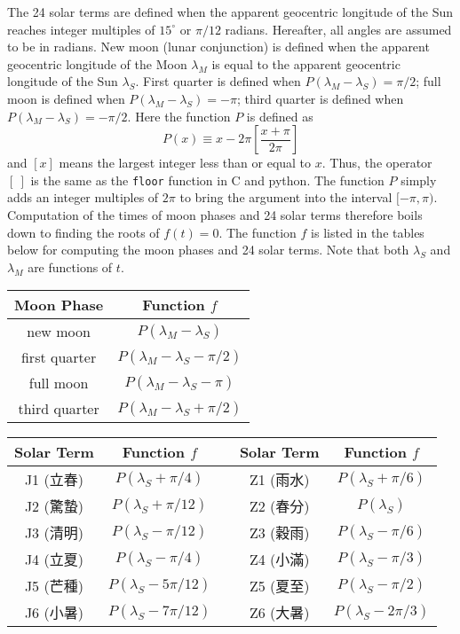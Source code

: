 \documentclass[12pt]{article}
\newcommand \beq {\begin{equation}}
\newcommand \eeq {\end{equation}}
\begin{document}
\begin{CJK}{UTF8}{bkai}
The 24 solar terms are defined when the apparent geocentric longitude of the 
Sun reaches integer multiples of $15^\circ$ or $\pi/12$ radians. Hereafter, 
all angles are assumed to be in radians. New moon (lunar conjunction) 
is defined when the apparent geocentric longitude of the Moon $\lambda_M$ is 
equal to the apparent geocentric longitude of the Sun $\lambda_S$. First 
quarter is defined when $P(\lambda_M-\lambda_S) = \pi/2$; 
full moon is defined when $P(\lambda_M-\lambda_S) = -\pi$; 
third quarter is defined when $P(\lambda_M-\lambda_S) = -\pi/2$. 
Here the function $P$ is defined as 
\beq
  P(x) \equiv x - 2\pi \left[ \frac{x+\pi}{2\pi}\right] 
\eeq
and $[x]$ means the largest integer less than or equal to $x$. Thus, the 
operator $[\ ]$ is the same as the {\tt floor} function in C and python. 
The function $P$ simply adds an integer multiples of $2\pi$ to bring the 
argument into the interval $[-\pi,\pi)$.
Computation of the times of moon phases and 24 solar terms therefore boils 
down to finding the roots of $f(t)=0$. The function $f$ is listed in the tables 
below for computing the moon phases and 24 solar terms. Note that both $\lambda_S$ 
and $\lambda_M$ are functions of $t$.
\vskip 5mm
\begin{tabular}{cc}
\hline
 Moon Phase & Function $f$ \\
\hline 
 new moon & $P(\lambda_M - \lambda_S)$ \\ 
 first quarter & $P(\lambda_M - \lambda_S - \pi/2)$ \\ 
 full moon & $P(\lambda_M - \lambda_S - \pi)$ \\
 third quarter & $P(\lambda_M - \lambda_S + \pi/2)$ \\
\hline
\end{tabular}
\begin{tabular}{cc|c|cc}
\hline
 Solar Term & Function $f$ & & Solar Term & Function $f$ \\
\hline
  J1 (立春) & $P(\lambda_S + \pi/4)$ & & Z1 (雨水) & $P(\lambda_S + \pi/6)$  \\ 
  J2 (驚蟄) & $P(\lambda_S + \pi/12)$ & & Z2 (春分) & $P(\lambda_S)$ \\
  J3 (清明) & $P(\lambda_S - \pi/12)$ & & Z3 (穀雨) & $P(\lambda_S - \pi/6)$ \\
  J4 (立夏) & $P(\lambda_S - \pi/4)$ & & Z4 (小滿) & $P(\lambda_S - \pi/3)$ \\
  J5 (芒種) & $P(\lambda_S - 5\pi/12)$ & & Z5 (夏至) & $P(\lambda_S - \pi/2)$ \\ 
  J6 (小暑) & $P(\lambda_S - 7\pi/12)$ & & Z6 (大暑) & $P(\lambda_S - 2\pi/3)$ \\

\end{tabular}
\end{CJK}
\end{document}
